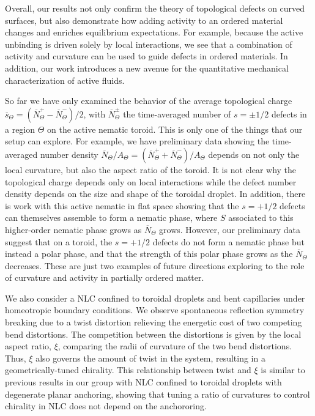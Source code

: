 Overall, our results not only confirm the theory of topological defects on curved surfaces, but also demonstrate how adding activity to an ordered material changes and enriches equilibrium expectations.
For example, because the active unbinding is driven solely by local interactions, we see that a combination of activity and curvature can be used to guide defects in ordered materials.
In addition, our work introduces a new avenue for the quantitative mechanical characterization of active fluids.

So far we have only examined the behavior of the average topological charge $\overbar{s}_{\Theta} = (\overbar{N}^{+}_{\Theta} - \overbar{N}^{-}_{\Theta})/2$, with $\overbar{N}^{\pm}_{\Theta}$ the time-averaged number of $s = \pm1/2$ defects in a region $\Theta$ on the active nematic toroid.
This is only one of the things that our setup can explore.
For example, we have preliminary data showing the time-averaged number density $\overbar{N}_{\Theta}/A_{\Theta} = (\overbar{N}^{+}_{\Theta} + \overbar{N}^{-}_{\Theta})/A_{\Theta}$ depends on not only the local curvature, but also the aspect ratio of the toroid.
It is not clear why the topological charge depends only on local interactions while the defect number density depends on the size and shape of the toroidal droplet.
In addition, there is work with this active nematic in flat space showing that the $s = +1/2$ defects can themselves assemble to form a nematic phase, where $S$ associated to this higher-order nematic phase grows as $\overbar{N}_{\Theta}$ grows.
However, our preliminary data suggest that on a toroid, the $s = +1/2$ defects do not form a nematic phase but instead a polar phase, and that the strength of this polar phase grows as the $\overbar{N}_{\Theta}$ decreases.
These are just two examples of future directions exploring to the role of curvature and activity in partially ordered matter.

We also consider a NLC confined to toroidal droplets and bent capillaries under homeotropic boundary conditions.
We observe spontaneous reflection symmetry breaking due to a twist distortion relieving the energetic cost of two competing bend distortions.
The competition between the distortions is given by the local aspect ratio, $\xi$, comparing the radii of curvature of the two bend distortions.
Thus, $\xi$ also governs the amount of twist in the system, resulting in a geometrically-tuned chirality.
This relationship between twist and $\xi$ is similar to previous results in our group with NLC confined to toroidal droplets with degenerate planar anchoring, showing that tuning a ratio of curvatures to control chirality in NLC does not depend on the anchororing.

